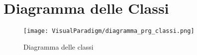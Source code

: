 \section{Diagramma delle Classi}
\label{sec:diagramma_delle_classi}

\begin{sidewaysfigure}[!ht]
  \centering
  \texttt{[image: VisualParadigm/diagramma\_prg\_classi.png]}
  \caption{Diagramma delle classi}
  \label{fig:prg_diagramma_classi}
\end{sidewaysfigure}

